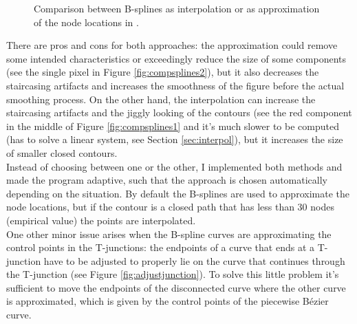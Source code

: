 \documentclass[]{usiinfbachelorproject}
\begin{document}
\begin{figure}[ht]
{		\label{fig:compsplines2}
	}
	\caption{Comparison between B-splines as  interpolation or as  approximation of the node locations in .}
	\label{fig:compsplines}
\end{figure}

\noindent There are pros and cons for both approaches: the approximation could remove some intended characteristics or exceedingly reduce the size of some components (see the single pixel in Figure \ref{fig:compsplines2}), but it also decreases the staircasing artifacts and increases the smoothness of the figure before the actual smoothing process. On the other hand, the interpolation can increase the staircasing artifacts and the jiggly looking of the contours (see the red component in the middle of Figure \ref{fig:compsplines1} and it's much slower to be computed (has to solve a linear system, see Section \ref{sec:interpol}), but it increases the size of smaller closed contours.\\
Instead of choosing between one or the other, I implemented both methods and made the program adaptive, such that the approach is chosen automatically depending on the situation. By default the B-splines are used to approximate the node locations, but if the contour is a closed path that has less than 30 nodes (empirical value) the points are interpolated.\\

One other minor issue arises when the B-spline curves are approximating the control points in the T-junctions: the endpoints of a curve that ends at a T-junction have to be adjusted to properly lie on the curve that continues through the T-junction (see Figure \ref{fig:adjustjunction}). To solve this little problem it's sufficient to move the endpoints of the disconnected curve where the other curve is approximated, which is given by the control points of the piecewise B\'ezier curve.
\end{document}

